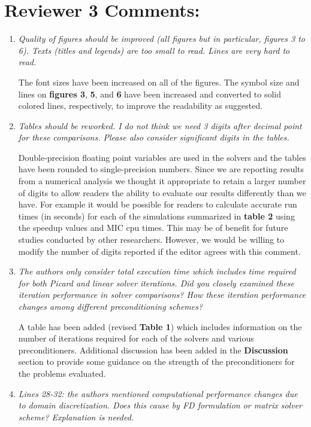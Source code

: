 \documentclass[12pt]{article} %
\begin{document}
\section*{Reviewer 3 Comments:}
\begin{enumerate}
\item \textit{Quality of figures should be improved (all figures but in particular, figures 3 to 6). Texts (titles and legends) are too small to read. Lines are very hard to read.} 

The font sizes have been increased on all of the figures. The symbol size and lines on \textbf{figures 3}, \textbf{5}, and \textbf{6} have been increased and converted to solid colored lines, respectively, to improve the readability as suggested.

\item \textit{Tables should be reworked. I do not think we need 3 digits after decimal point for these comparisons. Please also consider significant digits in the tables.} 

Double-precision floating point variables are used in the solvers and the tables have been rounded to single-precision numbers. Since we are reporting results from a numerical analysis we thought it appropriate to retain a larger number of digits to allow readers the ability to evaluate our results differently than we have. For example it would be possible for readers to calculate accurate run times (in seconds) for each of the simulations summarized in \textbf{table 2} using the speedup values and MIC cpu times. This may be of benefit for future studies conducted by other researchers. However, we would be willing to modify the number of digits reported if the editor agrees with this comment.

\item \textit{The authors only consider total execution time which includes time required for both Picard and linear solver iterations. Did you closely examined these iteration performance in solver comparisons? How these iteration performance changes among different preconditioning schemes? } 

A table has been added (revised \textbf{Table 1}) which includes information on the number of iterations required for each of the solvers and various preconditioners. Additional discussion has been added in the \textbf{Discussion} section to provide some guidance on the strength of the preconditioners for the problems evaluated.

\item \textit{Lines 28-32: the authors mentioned computational performance changes due to domain discretization. Does this cause by FD formulation or matrix solver scheme? Explanation is needed. } 


\end{enumerate}
\end{document}
